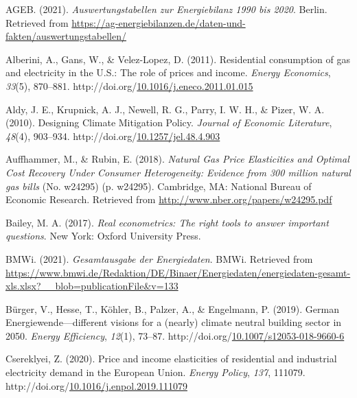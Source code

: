 \documentclass[12pt,twoside]{reedthesis}
\newlength{\cslhangindent}
\newenvironment{CSLReferences}[2] %
 {%
  \setlength{\parindent}{0pt}
  \ifodd #1 \everypar{\setlength{\hangindent}{\cslhangindent}}\ignorespaces\fi
  \ifnum #2 > 0
  \setlength{\parskip}{#2\baselineskip}
  \fi
 }%
 {}
\begin{document}
\hypertarget{refs}{}
\begin{CSLReferences}{1}{0}
\leavevmode{}%
AGEB. (2021). \emph{Auswertungstabellen zur Energiebilanz 1990 bis 2020}. Berlin. Retrieved from \url{https://ag-energiebilanzen.de/daten-und-fakten/auswertungstabellen/}

\leavevmode{}%
Alberini, A., Gans, W., \& Velez-Lopez, D. (2011). Residential consumption of gas and electricity in the U.S.: The role of prices and income. \emph{Energy Economics}, \emph{33}(5), 870--881. http://doi.org/\href{https://doi.org/10.1016/j.eneco.2011.01.015}{10.1016/j.eneco.2011.01.015}

\leavevmode{}%
Aldy, J. E., Krupnick, A. J., Newell, R. G., Parry, I. W. H., \& Pizer, W. A. (2010). Designing Climate Mitigation Policy. \emph{Journal of Economic Literature}, \emph{48}(4), 903--934. http://doi.org/\href{https://doi.org/10.1257/jel.48.4.903}{10.1257/jel.48.4.903}

\leavevmode{}%
Auffhammer, M., \& Rubin, E. (2018). \emph{Natural Gas Price Elasticities and Optimal Cost Recovery Under Consumer Heterogeneity: Evidence from 300 million natural gas bills} (No. w24295) (p. w24295). Cambridge, MA: National Bureau of Economic Research. Retrieved from \url{http://www.nber.org/papers/w24295.pdf}

\leavevmode{}%
Bailey, M. A. (2017). \emph{Real econometrics: The right tools to answer important questions}. New York: Oxford University Press.

\leavevmode{}%
BMWi. (2021). \emph{Gesamtausgabe der Energiedaten}. BMWi. Retrieved from \url{https://www.bmwi.de/Redaktion/DE/Binaer/Energiedaten/energiedaten-gesamt-xls.xlsx?__blob=publicationFile\&v=133}

\leavevmode{}%
Bürger, V., Hesse, T., Köhler, B., Palzer, A., \& Engelmann, P. (2019). German Energiewende---different visions for a (nearly) climate neutral building sector in 2050. \emph{Energy Efficiency}, \emph{12}(1), 73--87. http://doi.org/\href{https://doi.org/10.1007/s12053-018-9660-6}{10.1007/s12053-018-9660-6}

\leavevmode{}%
Csereklyei, Z. (2020). Price and income elasticities of residential and industrial electricity demand in the European Union. \emph{Energy Policy}, \emph{137}, 111079. http://doi.org/\href{https://doi.org/10.1016/j.enpol.2019.111079}{10.1016/j.enpol.2019.111079}


\end{CSLReferences}
\end{document}
